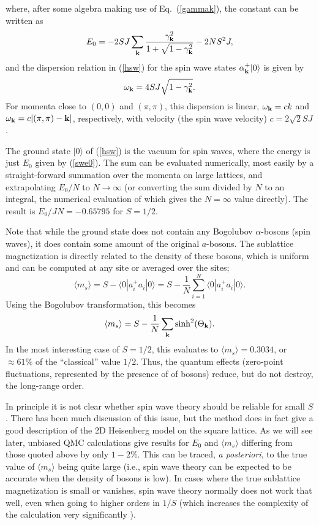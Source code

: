 \documentclass[draft,numberedheadings]{aipproc}
\begin{document}
where, after some algebra making use of Eq.~(\ref{gammak}), the constant can be written as
\begin{equation}
E_0 = -2SJ \sum_{\bf k}\frac{\gamma^2_{\bf k}}{1+\sqrt{1-\gamma^2_{\bf k}}}-2NS^2J,
\label{swe0}
\end{equation}
and the dispersion relation in (\ref{hsw}) for the spin wave states $\alpha_{\bf k}^+|0\rangle$ is given by
\begin{equation}
\omega_{\bf k} = 4SJ\sqrt{1-\gamma^2_{\bf k}}.
\end{equation}
For momenta close to $(0,0)$ and $(\pi,\pi)$, this dispersion is linear, $\omega_{\bf k} = ck$ and $\omega_{\bf k} = c|(\pi,\pi)-{\bf k}|$, respectively,
with velocity (the spin wave velocity) $c=2\sqrt{2}SJ$. 

The ground state $|0\rangle$ of (\ref{hsw}) is the vacuum for spin waves, where the energy is just $E_0$ given by (\ref{swe0}). The sum can be evaluated 
numerically, most easily by a straight-forward summation over the momenta on large lattices, and extrapolating $E_0/N$ to $N\to \infty$ (or converting 
the sum divided by $N$ to an integral, the numerical evaluation of which gives the $N=\infty$ value directly). The result is $E_0/JN = -0.65795$ 
for $S=1/2$. 

Note that while the ground state does not contain any Bogolubov $\alpha$-bosons (spin waves), it does contain some amount of the original 
$a$-bosons. The sublattice magnetization is directly related to the density of these bosons, which is uniform and can be computed at any site
or averaged over the sites;
\begin{equation} 
\langle m_s\rangle = S - \langle 0|a^+_ia_i|0 \rangle = S - \frac{1}{N} \sum_{i=1}^N \langle 0|a^+_ia_i|0 \rangle.
\end{equation}
Using the Bogolubov transformation, this becomes
\begin{equation}
\langle m_s\rangle = S - \frac{1}{N} \sum_{\bf k} \sinh^2(\Theta_{\bf k}).
\end{equation}
In the most interesting case of $S=1/2$, this evaluates to $\langle m_s\rangle = 0.3034$, or $\approx 61\%$ of the ``classical'' value $1/2$. 
Thus, the quantum effects (zero-point fluctuations, represented by the presence of of bosons) reduce, but do not destroy, the long-range order. 

In principle it is not clear whether spin wave theory should be reliable for small $S$. There has been much discussion of this issue, but the method 
does in fact give a good description of the 2D Heisenberg model on the square lattice. As we will see later, unbiased QMC calculations 
give results for $E_0$ and $\langle m_s\rangle$ differing from those quoted above by only $1-2$\%. This can be traced, {\it a posteriori}, to the 
true value of $\langle m_s\rangle$ being quite large (i.e., spin wave theory can be expected to be accurate when the density of bosons is low). In cases 
where the true sublattice magnetization is small or vanishes, spin wave theory normally does not work that well, even when going to higher orders in 
$1/S$ (which increases the complexity of the calculation very significantly \cite{canali,hamer,igarashi}).
\end{document}

